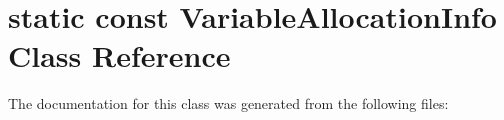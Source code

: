 \hypertarget{classstatic_01const_01VariableAllocationInfo}{}\section{static const Variable\+Allocation\+Info Class Reference}
\label{classstatic_01const_01VariableAllocationInfo}


The documentation for this class was generated from the following files\+: